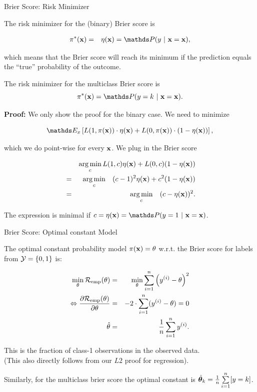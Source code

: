 \documentclass[11pt,compress,t,notes=noshow, xcolor=table]{beamer}
\begin{document}
\begin{vbframe}{Brier Score: Risk Minimizer}

The risk minimizer for the (binary) Brier score is 

\begin{eqnarray*}
\pixbayes &=& \eta(\xv) = \P(y~|~\xv = \xv),
\end{eqnarray*}

which means that the Brier score will reach its minimum if the prediction equals the \enquote{true} probability of the outcome. 

\lz 

The risk minimizer for the multiclass Brier score is 
$$\pi^\ast(\xv) = \P(y = k ~|~ \xv = \xv). $$
 

\textbf{Proof: } We only show the proof for the binary case. We need to minimize 

$$
\E_x \left[L(1, \pix) \cdot \eta(\xv) + L(0, \pix) \cdot (1 - \eta(\xv)) \right],
$$

which we do point-wise for every $\mathbf{x}$. We plug in the Brier score

\vspace*{-0.3cm}

\begin{eqnarray*}
	&& \operatorname*{arg\,min}_c L(1, c) \eta(\mathbf{x}) + L(0, c) (1 - \eta(\mathbf{x})) \\ 
	&=&  \operatorname*{arg\,min}_c \quad (c - 1)^2 \eta(\mathbf{x}) + c^2 (1 - \eta(\mathbf{x}))\\
	&=&  \operatorname*{arg\,min}_c \quad (c - \eta(\mathbf{x}))^2.
\end{eqnarray*}

The expression is minimal if $c = \eta(\xv) = \P(y = 1~|~\xv = \xv)$.

\end{vbframe}

\begin{vbframe}{Brier Score: Optimal constant Model}

The optimal constant probability model $\pi(\mathbf{x}) = \theta$ w.r.t. the Brier score for labels from $\mathcal{Y} = \{0, 1\}$ is:

\vspace*{-0.2cm}

\begin{eqnarray*}
  \min_{\theta} \mathcal{R}_{\text{emp}}(\theta) &=& \min_{\theta} \sum\limits_{i=1}^n \left(y^{(i)} - \theta\right)^2 \\
  \Leftrightarrow \frac{\partial \mathcal{R}_{\text{emp}}(\theta)}{\partial \theta} &=& - 2 \cdot \sum\limits_{i=1}^n (y^{(i)} - \theta) = 0 \\
  \hat \theta &=& \frac{1}{n} \sum\limits_{i=1}^n y^{(i)}.   
\end{eqnarray*}

This is the fraction of class-1 observations in the observed data.\\
(This also directly follows from our $L2$ proof for regression).

\vspace*{0.2cm}

Similarly, for the multiclass brier score the optimal constant is $\hat{\bm{\theta}}_k = \frac{1}{n}\sum\limits_{i=1}^n [y = k]$. 

\end{vbframe}


\endlecture
\end{document}
